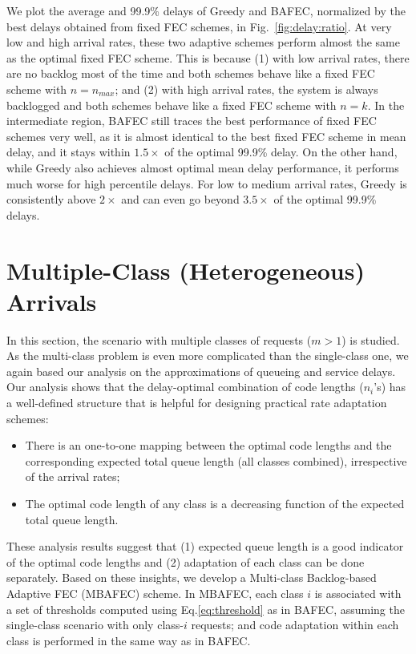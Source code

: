 \documentclass[journal]{IEEEtran}
\newcommand{\nonBlocking}{{BAFEC}\xspace}
\newcommand{\multiclass}{{MBAFEC}\xspace}
\begin{document}
We plot the average and 99.9\% delays of Greedy and \nonBlocking, normalized by the best delays obtained from fixed FEC schemes, in Fig.~\ref{fig:delay:ratio}. At very low and high arrival rates, these two adaptive schemes perform almost the same as the optimal fixed FEC scheme. This is because (1) with low arrival rates, there are no backlog most of the time and both schemes behave like a fixed FEC scheme with $n=n_{max}$; and (2) with high arrival rates, the system is always backlogged and both schemes behave like a fixed FEC scheme with $n=k$. In the intermediate region, \nonBlocking still traces the best performance of fixed FEC schemes very well, as it is almost identical to the best fixed FEC scheme in mean delay, and it stays within  $1.5\times$ of the optimal 99.9\% delay. On the other hand, while Greedy also achieves almost optimal mean delay performance, it performs much worse for high percentile delays. For low to medium arrival rates, Greedy is consistently above $2\times$ and can even go beyond $3.5\times$ of the optimal 99.9\% delays. 


\newcommand{\smallwidth}{0.26\textwidth}

\section{Multiple-Class (Heterogeneous) Arrivals}
\label{sec:theory}
In this section, the scenario with multiple classes of requests ($m>1$) is studied. As the multi-class problem is even more complicated than the single-class one, we again based our analysis on the approximations of queueing and service delays. Our analysis shows that the delay-optimal combination of code lengths ($n_i$'s) has a well-defined structure that is helpful for designing practical rate adaptation schemes:
\begin{itemize}
\item There is an one-to-one mapping between the optimal code lengths and the corresponding expected total queue length (all classes combined), irrespective of the arrival rates;
\item The optimal code length of any class is a decreasing function of the expected total queue length. 
\end{itemize}
These analysis results suggest that (1) expected queue length is a good indicator of the optimal code lengths and (2) adaptation of each class can be done separately.
Based on these insights, we
develop a Multi-class Backlog-based Adaptive FEC (\multiclass) scheme. In \multiclass, each class $i$ is associated with a set of thresholds computed using Eq.\ref{eq:threshold} as in \nonBlocking, assuming  the single-class scenario with only class-$i$ requests;  and code adaptation within each class is performed in the same way as in \nonBlocking. 
\end{document}
